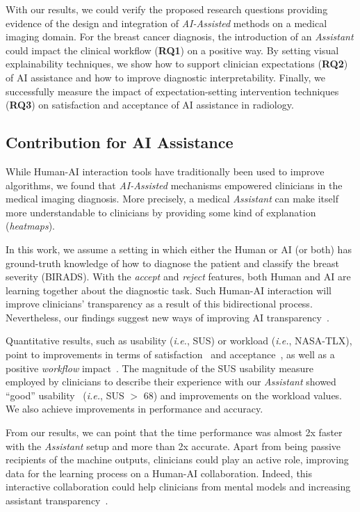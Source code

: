 With our results, we could verify the proposed research questions providing evidence of the design and integration of {\it AI-Assisted} methods on a medical imaging domain.
For the breast cancer diagnosis, the introduction of an {\it Assistant} could impact the clinical workflow ({\bf RQ1}) on a positive way.
By setting visual explainability techniques, we show how to support clinician expectations ({\bf RQ2}) of AI assistance and how to improve diagnostic interpretability.
Finally, we successfully measure the impact of expectation-setting intervention techniques ({\bf RQ3}) on satisfaction and acceptance of AI assistance in radiology.

\subsection{Contribution for AI Assistance}

While Human-AI interaction tools have traditionally been used to improve algorithms, we found that {\it AI-Assisted} mechanisms empowered clinicians in the medical imaging diagnosis.
More precisely, a medical {\it Assistant} can make itself more understandable to clinicians by providing some kind of explanation ({\it heatmaps}).

In this work, we assume a setting in which either the Human or AI (or both) has ground-truth knowledge of how to diagnose the patient and classify the breast severity (BIRADS).
With the {\it accept} and {\it reject} features, both Human and AI are learning together about the diagnostic task.
Such Human-AI interaction will improve clinicians' transparency as a result of this bidirectional process.
Nevertheless, our findings suggest new ways of improving AI transparency~\cite{Cai:2019:EEE:3301275.3302289}.

Quantitative results, such as usability ({\it i.e.}, SUS) or workload ({\it i.e.}, NASA-TLX), point to improvements in terms of satisfaction~\cite{Bonham:2019:ARS:3308557.3308726} and acceptance~\cite{Gambino:2019:DDR:3290607.3312916, Sonntag:2012:RMD:2166966.2167031}, as well as a positive {\it workflow} impact~\cite{DeBackere:2015:DPR:2826165.2826229}.
The magnitude of the SUS usability measure employed by clinicians to describe their experience with our {\it Assistant} showed ``good'' usability~\cite{info:doi/10.2196/18585} ({\it i.e.}, SUS $>$ 68) and improvements on the workload values.
We also achieve improvements in performance and accuracy.

From our results, we can point that the time performance was almost 2x faster with the {\it Assistant} setup and more than 2x accurate.
Apart from being passive recipients of the machine outputs, clinicians could play an active role, improving data for the learning process on a Human-AI collaboration.
Indeed, this interactive collaboration could help clinicians from mental models and increasing assistant transparency~\cite{amershi2014power, Cai:2019:HTC:3290605.3300234, Eslami:2016:FIL:2858036.2858494}.


